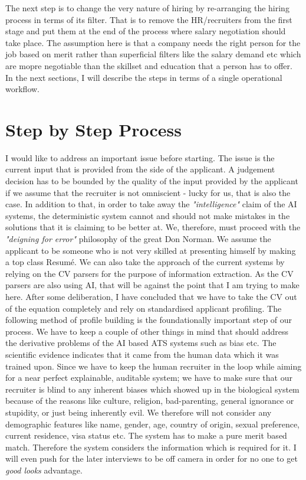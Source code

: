 \documentclass[a4paper, 12pt]{article}
\begin{document}
The next step is to change the very nature of hiring by re-arranging the hiring process in terms of its filter. That is to remove the HR/recruiters from the first stage and put them at the end of the process where salary negotiation should take place. The assumption here is that a company needs the right person for the job based on merit rather than superficial filters like the salary demand etc which are mopre negotiable than the skillset and education that a person has to offer. \\In the next sections, I will describe the steps in terms of a single operational workflow.

\section{Step by Step Process}

I would like to address an important issue before starting. The issue is the current input that is provided from the side of the applicant. A judgement decision has to be bounded by the quality of the input provided by the applicant if we assume that the recruiter is not omniscient -  lucky for us, that is also the case. In addition to that, in order to take away the \textit{"intelligence"} claim of the AI systems, the deterministic system cannot and should not make mistakes in the solutions that it is claiming to be better at. We, therefore, must proceed with the \textit{"deigning for error"} philosophy of the great Don Norman. We assume the applicant to be someone who is not very skilled at presenting himself by making a top class Resumé. We can also take the approach of the current systems by relying on the CV parsers for the purpose of information extraction. As the CV parsers are also using AI, that will be against the point that I am trying to make here. After some deliberation, I have concluded that we have to take the CV out of the equation completely and rely on standardised applicant profiling. The following method of profile building is the foundationally important step of our process. We have to keep a couple of other things in mind that should address the derivative problems of the AI based ATS systems such as bias etc. The scientific evidence indicates that it came from the human data which it was trained upon. Since we have to keep the human recruiter in the loop while aiming for a near perfect explainable, auditable system; we have to make sure that our recruiter is blind to any inherent biases which showed up in the biological system because of the reasons like culture, religion, bad-parenting, general ignorance or stupidity, or just being inherently evil. We therefore will not consider any demographic features like name, gender, age, country of origin, sexual preference, current residence, visa status etc. The system has to make a pure merit based match. Therefore the system considers the information which is required for it. I will even push for the later interviews to be off camera in order for no one to get \textit{good looks} advantage.
\end{document}
